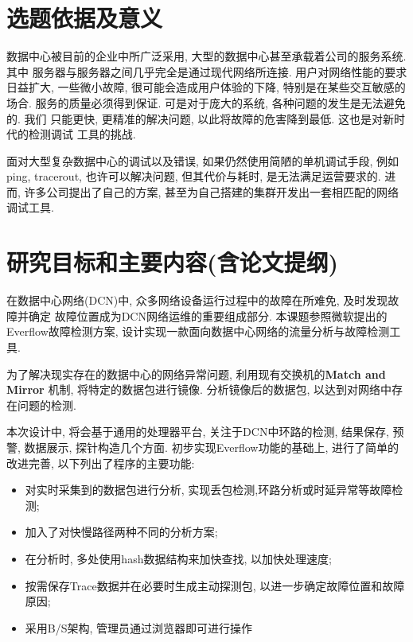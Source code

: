 
\chapter{选题依据及意义}

数据中心被目前的企业中所广泛采用,
大型的数据中心甚至承载着公司的服务系统. 其中
服务器与服务器之间几乎完全是通过现代网络所连接.
用户对网络性能的要求日益扩大, 一些微小故障, 很可能会造成用户体验的下降,
特别是在某些交互敏感的场合. 服务的质量必须得到保证. 可是对于庞大的系统,
各种问题的发生是无法避免的. 我们 只能更快, 更精准的解决问题,
以此将故障的危害降到最低. 这也是对新时代的检测调试 工具的挑战.

面对大型复杂数据中心的调试以及错误, 如果仍然使用简陋的单机调试手段,
例如ping, tracerout, 也许可以解决问题, 但其代价与耗时,
是无法满足运营要求的. 进而, 许多公司提出了自己的方案,
甚至为自己搭建的集群开发出一套相匹配的网络调试工具.



\chapter{研究目标和主要内容(含论文提纲)}

在数据中心网络(DCN)中, 众多网络设备运行过程中的故障在所难免,
及时发现故障并确定 故障位置成为DCN网络运维的重要组成部分.
本课题参照微软提出的Everflow故障检测方案,
设计实现一款面向数据中心网络的流量分析与故障检测工具.

为了解决现实存在的数据中心的网络异常问题, 利用现有交换机的\textbf{Match and
Mirror} 机制, 将特定的数据包进行镜像. 分析镜像后的数据包,
以达到对网络中存在问题的检测.

本次设计中, 将会基于通用的处理器平台, 关注于DCN中环路的检测, 结果保存,
预警, 数据展示, 探针构造几个方面. 初步实现Everflow功能的基础上,
进行了简单的改进完善, 以下列出了程序的主要功能:

\begin{itemize}
\item
  对实时采集到的数据包进行分析,
  实现丢包检测,环路分析或时延异常等故障检测;
\item
  加入了对快慢路径两种不同的分析方案;
\item
  在分析时, 多处使用hash数据结构来加快查找, 以加快处理速度;
\item
  按需保存Trace数据并在必要时生成主动探测包,
  以进一步确定故障位置和故障原因;
\item
  采用B/S架构, 管理员通过浏览器即可进行操作
\end{itemize}

